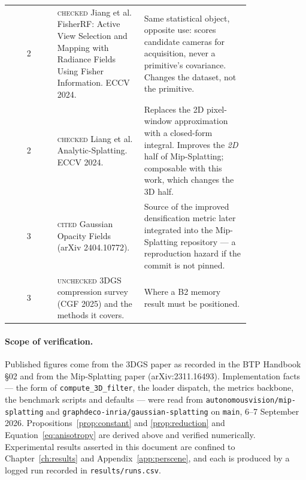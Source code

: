 \begin{table}[htbp]
\begin{tabular}{cp{0.36\linewidth}p{0.44\linewidth}}
    2 & \textsc{checked} Jiang et al. FisherRF: Active View Selection and Mapping with Radiance Fields Using Fisher Information. ECCV 2024. & Same statistical object, opposite use: scores candidate cameras for acquisition, never a primitive's covariance. Changes the dataset, not the primitive. \\
    2 & \textsc{checked} Liang et al. Analytic-Splatting. ECCV 2024. & Replaces the 2D pixel-window approximation with a closed-form integral. Improves the \emph{2D} half of Mip-Splatting; composable with this work, which changes the 3D half. \\
    3 & \textsc{cited} Gaussian Opacity Fields (arXiv 2404.10772). & Source of the improved densification metric later integrated into the Mip-Splatting repository --- a reproduction hazard if the commit is not pinned. \\
    3 & \textsc{unchecked} 3DGS compression survey (CGF 2025) and the methods it covers. & Where a B2 memory result must be positioned. \\
    \bottomrule
  \end{tabular}
\end{table}

\paragraph{Scope of verification.} Published figures come from the 3DGS paper as
recorded in the BTP Handbook \S02 and from the Mip-Splatting paper
(arXiv:2311.16493). Implementation facts --- the form of
\texttt{compute\_3D\_filter}, the loader dispatch, the metrics backbone, the
benchmark scripts and defaults --- were read from
\texttt{autonomousvision/mip-splatting} and
\texttt{graphdeco-inria/gaussian-splatting} on \texttt{main}, 6--7 September
2026. Propositions~\ref{prop:constant} and \ref{prop:reduction} and
Equation~\eqref{eq:anisotropy} are derived above and verified numerically.
Experimental results asserted in this document are confined to
Chapter~\ref{ch:results} and Appendix~\ref{app:perscene}, and each is produced by
a logged run recorded in \texttt{results/runs.csv}.
